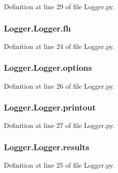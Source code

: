 Definition at line 29 of file Logger.\-py.

\hypertarget{classLogger_1_1Logger_a68875fbff44820c122a69fee38bad238}{
\subsubsection[{fh}]{\setlength{\rightskip}{0pt plus 5cm}Logger.\-Logger.\-fh}}\label{classLogger_1_1Logger_a68875fbff44820c122a69fee38bad238}


Definition at line 24 of file Logger.\-py.

\hypertarget{classLogger_1_1Logger_a8e881dc46a69491fab52e8fca3d8dd59}{
\subsubsection[{options}]{\setlength{\rightskip}{0pt plus 5cm}Logger.\-Logger.\-options}}\label{classLogger_1_1Logger_a8e881dc46a69491fab52e8fca3d8dd59}


Definition at line 26 of file Logger.\-py.

\hypertarget{classLogger_1_1Logger_abd7bd77ec56ae98c25ff4596ae8ee0ea}{
\subsubsection[{printout}]{\setlength{\rightskip}{0pt plus 5cm}Logger.\-Logger.\-printout}}\label{classLogger_1_1Logger_abd7bd77ec56ae98c25ff4596ae8ee0ea}


Definition at line 27 of file Logger.\-py.

\hypertarget{classLogger_1_1Logger_accc7402a4ee718e807f3f60d850d2072}{
\subsubsection[{results}]{\setlength{\rightskip}{0pt plus 5cm}Logger.\-Logger.\-results}}\label{classLogger_1_1Logger_accc7402a4ee718e807f3f60d850d2072}


Definition at line 25 of file Logger.\-py.

